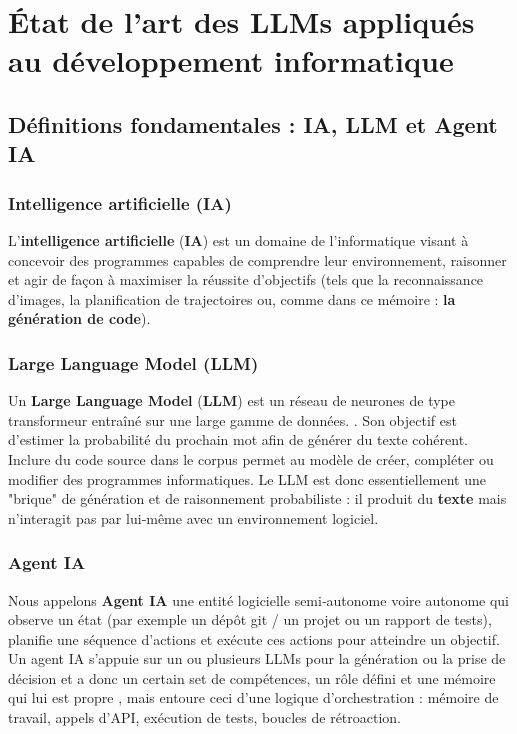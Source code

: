 \chapter{État de l'art des LLMs appliqués au développement informatique} \label{chapitre:etatArtLLM}

\section{Définitions fondamentales : IA, LLM et Agent IA}

\subsection{Intelligence artificielle (IA)}
L’\textbf{intelligence artificielle} (\textbf{IA}) est un domaine de l’informatique visant à concevoir des programmes capables de comprendre leur environnement, raisonner et agir de façon à maximiser la réussite d’objectifs (tels que la reconnaissance d’images, la planification de trajectoires ou, comme dans ce mémoire : \textbf{la génération de code}).

\subsection{Large Language Model (LLM)}
Un \textbf{Large Language Model} (\textbf{LLM}) est un réseau de neurones de type transformeur entraîné sur une large gamme de données. \parencite{cui_risk_2024}. Son objectif est d’estimer la probabilité du prochain mot afin de générer du texte cohérent. Inclure du code source dans le corpus permet au modèle de créer, compléter ou modifier des programmes informatiques. Le LLM est donc essentiellement une "brique" de génération et de raisonnement probabiliste : il produit du \textbf{texte} mais n’interagit pas par lui‑même avec un environnement logiciel.

%

\subsection{Agent IA}
Nous appelons \textbf{Agent IA} une entité logicielle semi‑autonome voire autonome qui observe un état (par exemple un dépôt git / un projet ou un rapport de tests), planifie une séquence d’actions et exécute ces actions pour atteindre un objectif.  Un agent IA s’appuie sur un ou plusieurs LLMs pour la génération ou la prise de décision et a donc un certain set de compétences, un rôle défini et une mémoire qui lui est propre \parencite{handler_taxonomy_2023}, mais entoure ceci d’une logique d’orchestration : mémoire de travail, appels d’API, exécution de tests, boucles de rétroaction.

